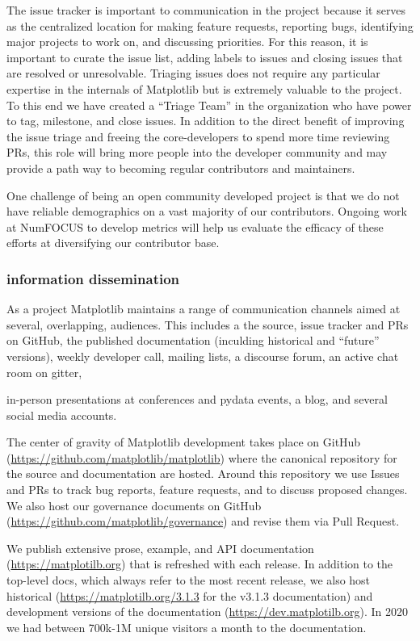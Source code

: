 \documentclass[12pt]{article}
\numberwithin{page}{section}
\begin{document}
The issue tracker is important to communication in the project because
it serves as the centralized location for making feature requests,
reporting bugs, identifying major projects to work on, and discussing
priorities.  For this reason, it is important to curate the issue
list, adding labels to issues and closing issues that are resolved or
unresolvable. Triaging issues does not require any particular
expertise in the internals of Matplotlib but is extremely valuable to
the project.  To this end we have created a ``Triage Team'' in the
organization who have power to tag, milestone, and close issues.  In
addition to the direct benefit of improving the issue triage and
freeing the core-developers to spend more time reviewing PRs, this
role will bring more people into the developer community and may
provide a path way to becoming regular contributors and maintainers.

One challenge of being an open community developed project is that we
do not have reliable demographics on a vast majority of our
contributors.  Ongoing work at NumFOCUS to develop metrics will help
us evaluate the efficacy of these efforts at diversifying our
contributor base.

\subsubsection{information dissemination}

As a project Matplotlib maintains a range of communication channels
aimed at several, overlapping, audiences.  This includes a
the source, issue tracker and PRs on GitHub,
the published documentation (inculding historical and ``future'' versions),
weekly developer call,
mailing lists,
a discourse forum,
an active chat room on gitter,

in-person presentations at conferences and pydata events,
a blog, and several social media accounts.


The center of gravity of Matplotlib development takes place on GitHub
(\url{https://github.com/matplotlib/matplotlib}) where the canonical
repository for the source and documentation are hosted.  Around this
repository we use Issues and PRs to track bug reports, feature
requests, and to discuss proposed changes.  We also host our
governance documents on GitHub
(\url{https://github.com/matplotlib/governance}) and revise them via
Pull Request.

We publish extensive prose, example, and API documentation
(\url{https://matplotilb.org}) that is refreshed with each release.
In addition to the top-level docs, which always refer to the most
recent release, we also host historical
(\url{https://matplotilb.org/3.1.3} for the v3.1.3 documentation) and
development versions of the documentation
(\url{https://dev.matplotilb.org}).  In 2020 we had between 700k-1M
unique visitors a month to the documentation.
\end{document}

